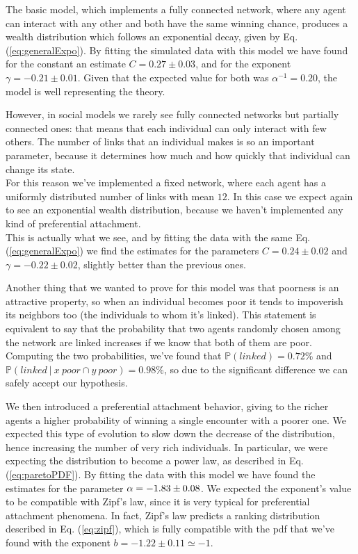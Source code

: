 The basic model, which implements a fully connected network, where any agent can interact with any other and both have the same winning chance, produces a wealth distribution which follows an exponential decay, given by Eq. (\ref{eq:generalExpo}).
By fitting the simulated data with this model we have found for the constant an estimate $C = 0.27 \pm 0.03$, and for the exponent $\gamma = -0.21 \pm 0.01$.
Given that the expected value for both was $\alpha^{-1} = 0.20$, the model is well representing the theory.

However, in social models we rarely see fully connected networks but partially connected ones: that means that each individual can only interact with few others.
The number of links that an individual makes is so an important parameter, because it determines how much and how quickly that individual can change its state. \\
For this reason we've implemented a fixed network, where each agent has a uniformly distributed number of links with mean $12$.
In this case we expect again to see an exponential wealth distribution, because we haven't implemented any kind of preferential attachment. \\
This is actually what we see, and by fitting the data with the same Eq. (\ref{eq:generalExpo}) we find the estimates for the parameters $C = 0.24 \pm 0.02$ and $\gamma = -0.22 \pm 0.02$, slightly better than the previous ones.

Another thing that we wanted to prove for this model was that poorness is an attractive property, so when an individual becomes poor it tends to impoverish its neighbors too (the individuals to whom it's linked).
This statement is equivalent to say that the probability that two agents randomly chosen among the network are linked increases if we know that both of them are poor. \\
Computing the two probabilities, we've found that $\mathbb{P}(linked) = 0.72\%$ and \\ $\mathbb{P}(linked \ \vert \ x \ poor \cap y \ poor) = 0.98\%$, so due to the significant difference we can safely accept our hypothesis.

We then introduced a preferential attachment behavior, giving to the richer agents a higher probability of winning a single encounter with a poorer one.
We expected this type of evolution to slow down the decrease of the distribution, hence increasing the number of very rich individuals.
In particular, we were expecting the distribution to become a power law, as described in Eq. (\ref{eq:paretoPDF}).
By fitting the data with this model we have found the estimates for the parameter $\alpha = -1.83 \pm 0.08$.
We expected the exponent's value to be compatible with Zipf's law, since it is very typical for preferential attachment phenomena.
In fact, Zipf's law predicts a ranking distribution described in Eq. (\ref{eq:zipf}), which is fully compatible with the pdf that we've found with the exponent $b = -1.22 \pm 0.11 \simeq -1$.


